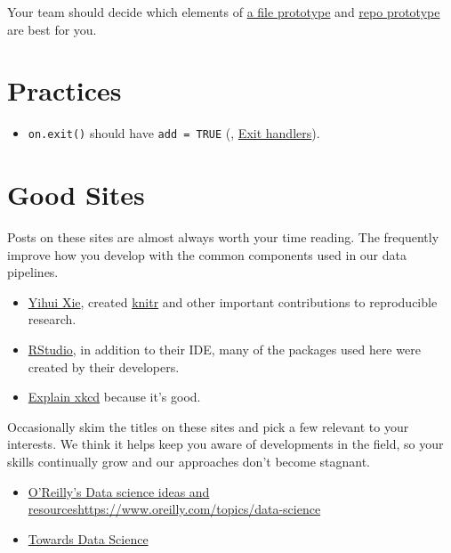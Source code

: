 \documentclass[
]{book}
\providecommand{\tightlist}{%
  \setlength{\itemsep}{0pt}\setlength{\parskip}{0pt}}
\begin{document}
\begin{enumerate}
  Your team should decide which elements of \href{https://ouhscbbmc.github.io/data-science-practices-1/file-prototype.html}{a file prototype} and \href{https://ouhscbbmc.github.io/data-science-practices-1/repo-prototype.html}{repo prototype} are best for you.
\end{enumerate}

\hypertarget{practices}{%
\section{Practices}\label{practices}}

\begin{itemize}
\tightlist
\item
  \texttt{on.exit()} should have \texttt{add\ =\ TRUE} (\citet{wickham-advanced-r}, \href{https://adv-r.hadley.nz/functions.html\#on-exit}{Exit handlers}).
\end{itemize}

\hypertarget{good-sites}{%
\section{Good Sites}\label{good-sites}}

Posts on these sites are almost always worth your time reading. The frequently improve how you develop with the common components used in our data pipelines.

\begin{itemize}
\tightlist
\item
  \href{https://yihui.org/en/}{Yihui Xie}, created \href{https://yihui.org/knitr/}{knitr} and other important contributions to reproducible research.
\item
  \href{https://blog.rstudio.com/}{RStudio}, in addition to their IDE, many of the packages used here were created by their developers.
\item
  \href{www.explainxkcd.com}{Explain xkcd} because it's good.
\end{itemize}

Occasionally skim the titles on these sites and pick a few relevant to your interests. We think it helps keep you aware of developments in the field, so your skills continually grow and our approaches don't become stagnant.

\begin{itemize}
\tightlist
\item
  \href{}{O'Reilly's Data science ideas and resources}\url{https://www.oreilly.com/topics/data-science}
\item
  \href{https://towardsdatascience.com/}{Towards Data Science}
\end{itemize}
\end{document}
